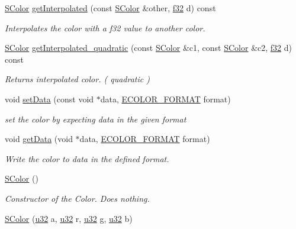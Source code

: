 \begin{DoxyCompactItemize}
\hyperlink{classirr_1_1video_1_1SColor}{S\+Color} \hyperlink{classirr_1_1video_1_1SColor_a20bfa471b5cf672db83355c181a3cae6}{get\+Interpolated} (const \hyperlink{classirr_1_1video_1_1SColor}{S\+Color} \&other, \hyperlink{namespaceirr_a0277be98d67dc26ff93b1a6a1d086b07}{f32} d) const
\begin{DoxyCompactList}\small\item\em Interpolates the color with a f32 value to another color. \end{DoxyCompactList}\item 
\hyperlink{classirr_1_1video_1_1SColor}{S\+Color} \hyperlink{classirr_1_1video_1_1SColor_addb63c4b8832c9bb01e4861e692e5f4f}{get\+Interpolated\+\_\+quadratic} (const \hyperlink{classirr_1_1video_1_1SColor}{S\+Color} \&c1, const \hyperlink{classirr_1_1video_1_1SColor}{S\+Color} \&c2, \hyperlink{namespaceirr_a0277be98d67dc26ff93b1a6a1d086b07}{f32} d) const
\begin{DoxyCompactList}\small\item\em Returns interpolated color. ( quadratic ) \end{DoxyCompactList}\item 
void \hyperlink{classirr_1_1video_1_1SColor_a381f2db0ed17c6b06ba5c8809dce3370}{set\+Data} (const void $\ast$data, \hyperlink{namespaceirr_1_1video_a1d5e487888c32b1674a8f75116d829ed}{E\+C\+O\+L\+O\+R\+\_\+\+F\+O\+R\+M\+AT} format)
\begin{DoxyCompactList}\small\item\em set the color by expecting data in the given format \end{DoxyCompactList}\item 
void \hyperlink{classirr_1_1video_1_1SColor_a7cba1b914230289de9c91ff28be96bc9}{get\+Data} (void $\ast$data, \hyperlink{namespaceirr_1_1video_a1d5e487888c32b1674a8f75116d829ed}{E\+C\+O\+L\+O\+R\+\_\+\+F\+O\+R\+M\+AT} format)
\begin{DoxyCompactList}\small\item\em Write the color to data in the defined format. \end{DoxyCompactList}\item 
\hyperlink{classirr_1_1video_1_1SColor_ab001c0c2515ff5f8a0b324d1345485f4}{S\+Color} ()
\begin{DoxyCompactList}\small\item\em Constructor of the Color. Does nothing. \end{DoxyCompactList}\item 
\hyperlink{classirr_1_1video_1_1SColor_aa2ca1fcb9b11375282bb407b635b3dd6}{S\+Color} (\hyperlink{namespaceirr_a0416a53257075833e7002efd0a18e804}{u32} a, \hyperlink{namespaceirr_a0416a53257075833e7002efd0a18e804}{u32} r, \hyperlink{namespaceirr_a0416a53257075833e7002efd0a18e804}{u32} g, \hyperlink{namespaceirr_a0416a53257075833e7002efd0a18e804}{u32} b)

\end{DoxyCompactItemize}
